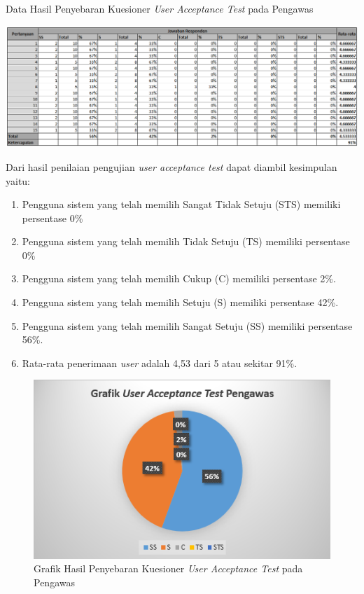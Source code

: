 \begin{table}[H]
	\centering
	\caption{Data Hasil Penyebaran Kuesioner \textit{User Acceptance Test} pada Pengawas}
	\includegraphics[width=1\textwidth]{gambar/Hasil_Pengawas}
\end{table}

Dari hasil penilaian pengujian \textit{user acceptance test} dapat diambil kesimpulan yaitu:

\begin{enumerate}
	\item Pengguna sistem yang telah memilih Sangat Tidak Setuju (STS) memiliki persentase 0\%
	\item Pengguna sistem yang telah memilih Tidak Setuju (TS) memiliki persentase 0\%
	\item Pengguna sistem yang telah memilih Cukup (C) memiliki persentase 2\%.
	\item Pengguna sistem yang telah memilih Setuju (S) memiliki persentase 42\%.
	\item Pengguna sistem yang telah memilih Sangat Setuju (SS) memiliki persentase 56\%.
	\item Rata-rata penerimaan \textit{user} adalah 4,53 dari 5 atau sekitar 91\%.
\end{enumerate}

\begin{figure}[H]
	\centering
	\includegraphics[width=1\textwidth]{gambar/Grafik_Pengawas}
	\caption{Grafik Hasil Penyebaran Kuesioner \textit{User Acceptance Test} pada Pengawas}
\end{figure}

